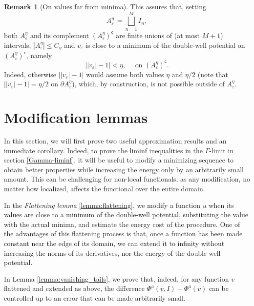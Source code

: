 \documentclass{article}
\theoremstyle{definition}
\newtheorem{Remark}[Theorem]{Remark}
\newcommand{\e}{\varepsilon}
\def\e{\varepsilon}
\begin{document}
\begin{Remark}[On values far from minima]
    This assures that, setting
    \begin{equation}
    \label{def:A_eta}
        A^\eta_{\e}\coloneqq \bigsqcup_{n=1}^M I_n,
    \end{equation} 
     both $A^\eta_\e$ and its complement $(A^\eta_\e)^{\mathsf c}$ are finite unions of (at most $M+1$) intervals, $|A^\eta_\e|\leq C_\eta$ and
        $v_{\e}$ is close to a minimum of the double-well potential on $(A^\eta_\e)^{\mathsf c}$, namely
       \[\big||v_\e|-1\big|< \eta, \quad \text{ on }(A^\eta_\e)^{\mathsf c}.\]
      Indeed, otherwise $\big||v_{\e}| -1\big|$ would assume both values $\eta$ and $\eta/2$ (note that $\big||v_{\e}| -1\big|=\eta/2$ on $\partial A^\eta_\e$), which, by construction, is not possible outside of $A^\eta_\e$.

\end{Remark}


\section{Modification lemmas} 
In this section, we will first prove two useful approximation results and an immediate corollary. Indeed, to prove the liminf inequalities in the $\Gamma$-limit in section \ref{Gamma-liminf}, it will be useful to modify a minimizing sequence to obtain better properties while increasing the energy only by an arbitrarily small amount. 
This can be challenging for non-local functionals, as any modification, no matter how localized, affects the functional over the entire domain. 

In the \emph{Flattening lemma} \ref{lemma:flattening}, we modify a function $u$ when its values are close to a minimum of the double-well potential, substituting the value with the actual minima, and estimate the energy cost of the procedure. 
One of the advantages of this flattening process is that, once a function has been made constant near the edge of its domain, we can extend it to infinity without increasing the norms of its derivatives, nor the energy of the double-well potential.

In Lemma \ref{lemma:vanishing_tails}, we prove that, indeed, for any function $v$ flattened and extended as above, the difference $\Phi^a(v, I)-\Phi^a(v)$ can be controlled up to an error that can be made arbitrarily small.
\end{document}
